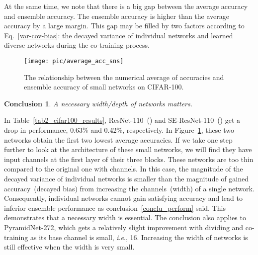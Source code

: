 \documentclass[lettersize,journal]{IEEEtran}
\newcommand{\ie}{\textit{i}.\textit{e}.}
\newtheorem{conclusion}{Conclusion}
\begin{document}
At the same time, we note that there is a big gap between 
the average accuracy and ensemble accuracy.
The ensemble accuracy is higher than the average accuracy by
a large margin.
This gap may be filled by two factors according to Eq.~\eqref{var-cov-bias}:
the decayed variance of individual networks and learned diverse networks
during the co-training process.
\begin{figure}[!t]
	\centering
	\texttt{[image: pic/average\_acc\_sns]}
	\caption{The relationship between the  numerical average of accuracies
		and ensemble accuracy of small networks on CIFAR-100.}
	\label{average_acc}
\end{figure}

\begin{conclusion}  \label{conclu_necessary}
	\textit{A necessary width/depth of networks matters.}
\end{conclusion}

In Table~\ref{tab2_cifar100_results},
ResNet-110~() and SE-ResNet-110~() get a drop in performance,
0.63\% and 0.42\%, respectively.
In Figure~\ref{average_acc}, these two networks obtain the first two lowest
average accuracies.
If we take one step further to look at the architecture of these small networks,
we will find they have input channels 
 at the first layer of their three blocks.
These networks are too thin compared to the original one with  
 channels.
In this case, the magnitude of the decayed variance of individual networks
is smaller than the magnitude of gained accuracy~(decayed bias)
from increasing the channels~(width) of a single network.
Consequently, individual networks cannot gain satisfying accuracy
and lead to inferior ensemble performance as conclusion~\ref{conclu_perform} said.
This demonstrates that a necessary width is essential.
The conclusion also applies to PyramidNet-272,
which gets a relatively slight improvement with
dividing and co-training as its base channel is small, \ie, 16.
Increasing the width of networks is still effective when the width is very small.
\end{document}
